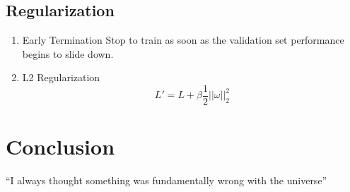 \documentclass{article}
\begin{document}
\subsection{Regularization}

\begin{enumerate}
	\item Early Termination
	Stop to train as soon as the validation set performance begins to slide down.
	\item L2 Regularization
	$$ L' = L + \beta \frac{1}{2} ||\omega||_{2}^2 $$
	
\end{enumerate}

\section{Conclusion}
``I always thought something was fundamentally wrong with the universe'' \citep{adams1995hitchhiker}



\end{document}

